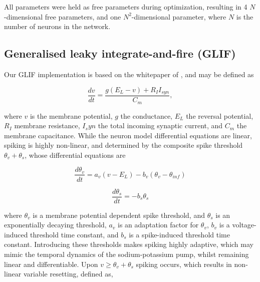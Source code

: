 \documentclass[mphil,deptreport,ianc]{infthesis} %
\begin{document}

All parameters were held as free parameters during optimization, resulting in 4 $N$-dimensional free parameters, and one $N^2$-dimensional parameter, where $N$ is the number of neurons in the network. 


\subsection{Generalised leaky integrate-and-fire (GLIF)}

Our GLIF implementation is based on the whitepaper of \cite{allen_glif_white_paper}, and may be defined as

\begin{equation}
    \frac{dv}{dt} = \frac{g (E_L - v) + R_I I_{syn}}{C_m},
\end{equation}

where $v$ is the membrane potential, $g$ the conductance, $E_L$ the reversal potential, $R_I$ membrane resistance, $I_syn$ the total incoming synaptic current, and $C_m$ the membrane capacitance.
While the neuron model differential equations are linear, spiking is highly non-linear, and determined by the composite spike threshold $\theta_v + \theta_s$, whose differential equations are

\begin{equation}
    \frac{d\theta_v}{dt} = a_v (v - E_L) - b_v (\theta_v - \theta_{inf})
\end{equation}

\begin{equation}
    \frac{d\theta_s}{dt} = - b_s \theta_s
\end{equation}

where $\theta_v$ is a membrane potential dependent spike threshold, and $\theta_s$ is an exponentially decaying threshold, $a_v$ is an adaptation factor for $\theta_v$, $b_v$ is a voltage-induced threshold time constant, and $b_s$ is a spike-induced threshold time constant.
Introducing these thresholds makes spiking highly adaptive, which may mimic the temporal dynamics of the sodium-potassium pump, whilst remaining linear and differentiable.
Upon $v \geq \theta_v + \theta_s$ spiking occurs, which results in non-linear variable resetting, defined as,
\end{document}
